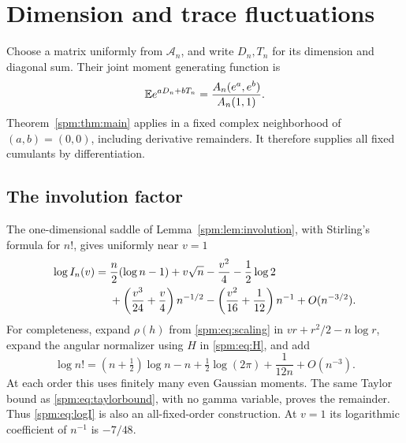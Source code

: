 \section{Dimension and trace fluctuations}\label{spm:sec:fluctuations}
Choose a matrix uniformly from $\mathcal A_n$, and write $D_n,T_n$ for its dimension and diagonal sum. Their joint moment generating function is
\[
 \mathbb E e^{aD_n+bT_n}=\frac{A_n(e^a,e^b)}{A_n(1,1)}.
\]
Theorem~\ref{spm:thm:main} applies in a fixed complex neighborhood of $(a,b)=(0,0)$, including derivative remainders. It therefore supplies all fixed cumulants by differentiation.

\subsection{The involution factor}
The one-dimensional saddle of Lemma~\ref{spm:lem:involution}, with Stirling's formula for $n!$, gives uniformly near $v=1$
\begin{align}\label{spm:eq:logI}
 \log I_n(v)={}&\frac n2(\log n-1)+v\sqrt n-\frac{v^2}{4}
              -\frac12\log2\notag\\
 &+\left(\frac{v^3}{24}+\frac v4\right)n^{-1/2}
   -\left(\frac{v^2}{16}+\frac1{12}\right)n^{-1}
   +O(n^{-3/2}).
\end{align}
For completeness, expand $\rho(h)$ from \eqref{spm:eq:scaling} in
$vr+r^2/2-n\log r$, expand the angular normalizer using $H$ in \eqref{spm:eq:H}, and add
\[
 \log n!=(n+\tfrac12)\log n-n+\tfrac12\log(2\pi)
             +\frac1{12n}+O(n^{-3}).
\]
At each order this uses finitely many even Gaussian moments. The same Taylor bound as \eqref{spm:eq:taylorbound}, with no gamma variable, proves the remainder. Thus \eqref{spm:eq:logI} is also an all-fixed-order construction. At $v=1$ its logarithmic coefficient of $n^{-1}$ is $-7/48$.

